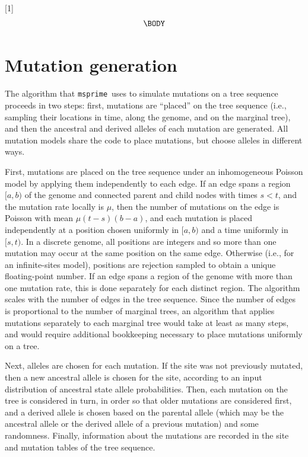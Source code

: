 \documentclass{article}
\newcommand{\msprime}[0]{\texttt{msprime}}
\begin{document}
[1]{%
\begin{equation}
\label{#1}
\begin{split}
  \BODY
\end{split}\end{equation}
}

\setcounter{secnumdepth}{2} %

\appendix

\section*{Mutation generation}
\label{app-mutation-algorithm}

The algorithm that \msprime\ uses to simulate mutations on a tree sequence
proceeds in two steps:
first, mutations are ``placed'' on the tree sequence
(i.e., sampling their locations in time, along the genome, and on the marginal tree),
and then the ancestral and derived alleles of each mutation are generated.
All mutation models share the code to place mutations,
but choose alleles in different ways.

First, mutations are placed on the tree sequence under an inhomogeneous Poisson model
by applying them independently to each edge.
If an edge spans a region $[a, b)$ of the genome
and connected parent and child nodes with times $s < t$,
and the mutation rate locally is $\mu$,
then the number of mutations on the edge is Poisson with mean $\mu (t-s) (b-a)$,
and each mutation is placed independently at a position chosen uniformly in $[a,b)$
and a time uniformly in $[s,t)$.
In a discrete genome, all positions are integers and so more than one mutation
may occur at the same position on the same edge.
Otherwise (i.e., for an infinite-sites model),
positions are rejection sampled to obtain a unique floating-point number.
If an edge spans a region of the genome with more than one mutation rate,
this is done separately for each distinct region.
The algorithm scales with the number of edges in the tree sequence.
Since the number of edges is proportional to the number of marginal trees,
an algorithm that applies mutations separately to each marginal tree
would take at least as many steps,
and would require additional bookkeeping necessary to place mutations uniformly on a tree.

Next, alleles are chosen for each mutation.
If the site was not previously mutated, then a new ancestral allele is chosen for the site,
according to an input distribution of ancestral state allele probabilities.
Then, each mutation on the tree is considered in turn,
in order so that older mutations are considered first,
and a derived allele is chosen based on the parental allele
(which may be the ancestral allele or the derived allele of a previous mutation)
and some randomness.
Finally, information about the mutations are recorded in the site and mutation tables
of the tree sequence.
\end{document}
